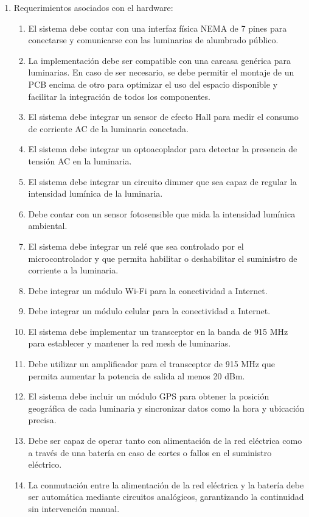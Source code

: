 \documentclass[
11pt, %
]{charter}
\begin{document}
\begin{enumerate}
	\item Requerimientos asociados con el hardware:
		\begin{enumerate}
			\item El sistema debe contar con una interfaz física NEMA de 7 pines para conectarse y comunicarse con las luminarias de alumbrado público.
			\item La implementación debe ser compatible con una carcasa genérica para luminarias. En caso de ser necesario, se debe permitir el montaje de un PCB encima de otro para optimizar el uso del espacio disponible y facilitar la integración de todos los componentes.
			\item  El sistema debe integrar un sensor de efecto Hall para medir el consumo de corriente AC de la luminaria conectada.
			\item El sistema debe integrar un optoacoplador para detectar la presencia de tensión AC en la luminaria.
 			\item El sistema debe integrar un circuito dimmer que sea capaz de regular la intensidad lumínica de la luminaria.
			\item Debe contar con un sensor fotosensible que mida la intensidad lumínica ambiental.
			\item El sistema debe integrar un relé que sea controlado por el microcontrolador y que permita habilitar o deshabilitar el suministro de corriente a la luminaria.
			\item Debe integrar un módulo Wi-Fi para la conectividad a Internet.
			\item Debe integrar un módulo celular para la conectividad a Internet.
			\item El sistema debe implementar un transceptor en la banda de 915 MHz para establecer y mantener la red mesh de luminarias.
			\item Debe utilizar un amplificador para el transceptor de 915 MHz que permita aumentar la potencia de salida al menos 20 dBm.
			\item El sistema debe incluir un módulo GPS para obtener la posición geográfica de cada luminaria y sincronizar datos como la hora y ubicación precisa.
			\item Debe ser capaz de operar tanto con alimentación de la red eléctrica como a través de una batería en caso de cortes o fallos en el suministro eléctrico. 
			\item La conmutación entre la alimentación de la red eléctrica y la batería debe ser automática mediante circuitos analógicos, garantizando la continuidad sin	intervención manual.

\end{enumerate}
\end{enumerate}
\end{document}
